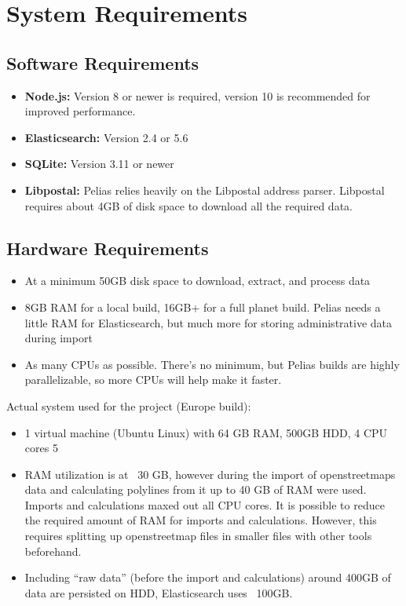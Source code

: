 \section{System Requirements}
\subsection{Software Requirements}
\begin{itemize}
\item \textbf{Node.js:} Version 8 or newer is required, version 10 is recommended for improved performance.
\item \textbf{Elasticsearch:} Version 2.4 or 5.6
\item \textbf{SQLite:} Version 3.11 or newer
\item \textbf{Libpostal:} Pelias relies heavily on the Libpostal address parser. Libpostal requires about 4GB of disk space to download all the required data.
\end{itemize}

\subsection{Hardware Requirements}
\begin{itemize}
\item At a minimum 50GB disk space to download, extract, and process data
\item 8GB RAM for a local build, 16GB+ for a full planet build. Pelias needs a little RAM for Elasticsearch, but much more for storing administrative data during import
\item As many CPUs as possible. There's no minimum, but Pelias builds are highly parallelizable, so more CPUs will help make it faster.
\end{itemize}

Actual system used for the project (Europe build):
\begin{itemize}
\item 1 virtual machine (Ubuntu Linux) with 64 GB RAM, 500GB HDD, 4 CPU cores
5
\item RAM utilization is at ~30 GB, however during the import of openstreetmaps data and calculating polylines from it up to 40 GB of RAM were used. Imports and calculations maxed out all CPU cores. It is possible to reduce the required amount of RAM for imports and calculations. However, this requires splitting up openstreetmap files in smaller files with other tools beforehand.
\item Including “raw data” (before the import and calculations) around 400GB of data are persisted on HDD, Elasticsearch uses ~100GB.
\end{itemize}